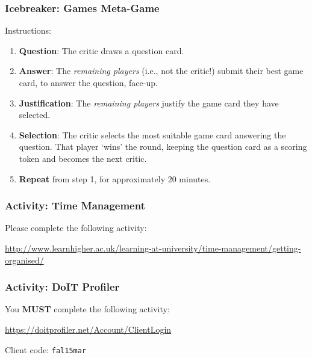\begin{frame}
	\frametitle{Icebreaker: Games Meta-Game}
	
	Instructions:
	
	\begin{enumerate}
		\item 	\textbf{Question}: The critic draws a question card. 
		\item 	\textbf{Answer}: The \textit{remaining players} (i.e., not the critic!) submit their best game card, to answer the question, face-up.
		\item 	\textbf{Justification}: The \textit{remaining players} justify the game card they have selected.
		\item 	\textbf{Selection}: The critic selects the most suitable game card answering the question. That player `wins' the round, keeping the question card as a scoring token and becomes the next critic.	
		\item 	\textbf{Repeat} from step 1, for approximately 20 minutes.	
	\end{enumerate}
\end{frame}

\begin{frame}
	\frametitle{Activity: Time Management}
	
	Please complete the following activity:
	
	\vspace{2em}
	
	\url{http://www.learnhigher.ac.uk/learning-at-university/time-management/getting-organised/}

\end{frame}

\begin{frame}
	\frametitle{Activity: DoIT Profiler}
	
	You \textbf{MUST} complete the following activity:
	
	\vspace{2em}
	
	\url{https://doitprofiler.net/Account/ClientLogin}
	
	\vspace{2em}
	
	Client code: \texttt{fal15mar}

\end{frame}


